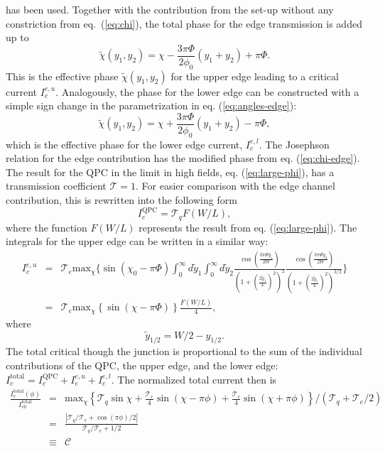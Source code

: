 has been used. Together with the contribution from the set-up without any constriction from eq.~(\ref{eq:chi}), the total phase for the edge transmission is added up to
\begin{equation}
\tilde{\chi}(y_1, y_2) = \chi - \frac{3 \pi \Phi}{2\phi_0} (y_1 + y_2) + \pi \Phi \label{eq:chi-edge}.
\end{equation}
This is the effective phase $\tilde{\chi}(y_1, y_2)$ for the upper edge leading to a critical current $I_c^{e, u}$. Analogously, the phase for the lower edge can be constructed with a simple sign change in the parametrization in eq. (\ref{eq:angles-edge}):
\begin{equation}
\tilde{\chi}(y_1, y_2) = \chi + \frac{3 \pi \Phi}{2\phi_0} (y_1 + y_2) - \pi \Phi,
\end{equation}
which is the effective phase for the lower edge current, $I_c^{e, l}$.
The Josephson relation for the edge contribution has the modified phase from eq. (\ref{eq:chi-edge}). 
The result for the QPC in the limit in high fields, eq. (\ref{eq:large-phi}), has a transmission coefficient $\mathcal{T} = 1$. For easier comparison with the edge channel contribution, this is rewritten into the following form
\begin{equation}
I_c^{\text{QPC}} = \mathcal{T}_q F(W/L),
\end{equation}
where the function $F(W/L)$ represents the result from eq. (\ref{eq:large-phi}). The integrals for the upper edge can be written in a similar way:
\begin{eqnarray}
I_c^{e, u} &=& \mathcal{T}_e \text{max}_{\chi} \{ \sin \left( \chi_0 - \pi \Phi \right) \int_0^\infty d \tilde{y}_1 \int_0^\infty d \tilde{y}_2 \frac{\cos \left( \frac{3 \pi \Phi \tilde{y}_1}{2 W} \right) }{\left( 1 + \left( \frac{2 \tilde{y}_1}{L}\right)^2 \right)^2} \frac{\cos \left( \frac{3 \pi \Phi \tilde{y}_2}{2 W} \right)}{\left( 1 + \left( \frac{2 \tilde{y}_1}{L}\right)^2 \right)^{3/2}} \}\\
&=& \mathcal{T}_e \text{max}_{\chi} \left\{ \sin \left( \chi - \pi \Phi \right) \right\} \frac{F(W/L)}{4}, 
\end{eqnarray}
where
\begin{equation}
\tilde{y}_{1/2} = W/2 - y_{1/2}.
\end{equation}
The total critical though the junction is proportional to the sum of the individual contributions of the QPC, the upper edge, and the lower edge: $I_c^\text{total} = I_c^\text{QPC} + I_c^{e,u} + I_c^{e,l}$. The normalized total current then is
\begin{eqnarray}
\frac{I_c^\text{total}\left( \phi \right)}{I^\text{total}_{c0}} &=& \text{max}_\chi \left\{ \mathcal{T}_q \sin \chi + \frac{\mathcal{T}_e}{4} \sin \left( \chi - \pi \phi \right) + \frac{\mathcal{T}_e}{4} \sin \left( \chi + \pi \phi \right) \right\} / \left( \mathcal{T}_q + \mathcal{T}_e/2 \right)\\
&=& \frac{| \mathcal{T}_q / \mathcal{T}_e + \cos \left( \pi \phi \right)/2 |}{\mathcal{T}_q / \mathcal{T}_e + 1/2}\label{eq:ratio-transmissions} \\
&\equiv & \mathcal{C}
\end{eqnarray}

